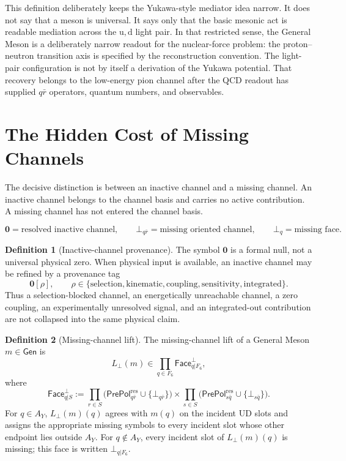 \documentclass[11pt]{article}
\theoremstyle{definition}
\newtheorem{definition}{Definition}
\theoremstyle{plain}
\newcommand{\qu}{\mathrm u}
\newcommand{\qd}{\mathrm d}
\begin{document}
This definition deliberately keeps the Yukawa-style mediator idea narrow.
It does not say that a meson is universal.  It says only that the basic
mesonic act is readable mediation across the \(\qu,\qd\) light pair.  In
that restricted sense, the General Meson is a deliberately narrow readout
for the nuclear-force problem: the proton--neutron transition axis is
specified by the reconstruction convention.
The light-pair configuration is not by itself a derivation of the Yukawa
potential.  That recovery belongs to the low-energy pion channel after the
QCD readout has supplied \(q\bar r\) operators, quantum numbers, and
observables.

\section{The Hidden Cost of Missing Channels}

The decisive distinction is between an inactive channel and a missing
channel.  An inactive channel belongs to the channel basis and carries no
active contribution.  A missing channel has not entered the channel basis.

\[
  \mathbf 0=\text{resolved inactive channel},
  \qquad
  \bot_{q\bar r}=\text{missing oriented channel},
  \qquad
  \bot_q=\text{missing face}.
\]

\begin{definition}[Inactive-channel provenance]
The symbol \(\mathbf 0\) is a formal null, not a universal physical zero.
When physical input is available, an inactive channel may be refined by a
provenance tag
\[
  \mathbf 0[\rho],
  \qquad
  \rho\in
  \{\mathrm{selection},\mathrm{kinematic},\mathrm{coupling},
    \mathrm{sensitivity},\mathrm{integrated}\}.
\]
Thus a selection-blocked channel, an energetically unreachable channel, a zero
coupling, an experimentally unresolved signal, and an integrated-out
contribution are not collapsed into the same physical claim.
\end{definition}

\begin{definition}[Missing-channel lift]
The missing-channel lift of a General Meson \(m\in\mathsf{Gen}\) is
\[
  L_{\bot}(m)\in
  \prod_{q\in F_6}\mathsf{Face}^{\bot}_{q|F_6},
\]
where
\[
  \mathsf{Face}^{\bot}_{q|S}
  :=
  \prod_{r\in S}
    \bigl(\mathsf{PrePol}^{\mathrm{res}}_{q\bar r}\cup\{\bot_{q\bar r}\}\bigr)
  \times
  \prod_{s\in S}
    \bigl(\mathsf{PrePol}^{\mathrm{res}}_{s\bar q}\cup\{\bot_{s\bar q}\}\bigr).
\]
For \(q\in A_Y\), \(L_{\bot}(m)(q)\) agrees with \(m(q)\) on the incident
UD slots and assigns the appropriate missing symbols to every incident
slot whose other endpoint lies outside \(A_Y\).  For \(q\notin A_Y\), every
incident slot of \(L_{\bot}(m)(q)\) is missing; this face is written
\(\bot_{q|F_6}\).
\end{definition}
\end{document}
